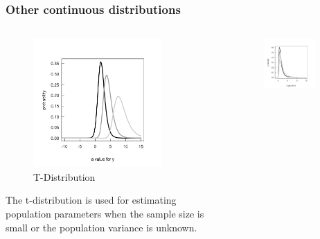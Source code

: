 \documentclass{beamer}
\begin{document}
\begin{frame}[fragile]
\frametitle{Other continuous distributions}
    \begin{columns}
        \begin{column}{0.45\textwidth}
            \small
            \begin{figure}
                \centering
            \includegraphics[width=0.8\textwidth]{lectures/day_9_refreshing_glm/figures/unnamed-chunk-4-1.png}
            \caption{T-Distribution}
            \end{figure}
            \small
            The t-distribution is used for estimating population parameters when the sample size is small or the population variance is unknown.
        \end{column}
        \begin{column}{0.45\textwidth}
            \begin{figure}
                \centering
                \includegraphics[width=0.8\textwidth]{lectures/day_9_refreshing_glm/figures/unnamed-chunk-5-1.png}

\end{figure}
\end{column}
\end{columns}
\end{frame}
\end{document}
